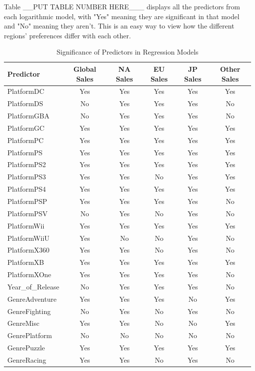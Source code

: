 \documentclass[12pt]{article}
\begin{document}
Table __PUT TABLE NUMBER HERE___ displays all the predictors from each logarithmic model, with "Yes" meaning they are significant in 
that model and "No" meaning they aren't. This is an easy way to view how the different regions' preferences differ with each other. 
\begin{table}[ht]
  \caption{Significance of Predictors in Regression Models}
  \label{tab:significance}
  \centering
  \begin{tabular}{lccccc}
    \hline
    Predictor & Global Sales & NA Sales & EU Sales & JP Sales & Other Sales \\
    \hline
    PlatformDC & Yes & Yes & Yes & Yes & Yes \\
    PlatformDS & No & Yes & Yes & Yes & No \\
    PlatformGBA & No & Yes & Yes & Yes & No \\
    PlatformGC & Yes & Yes & Yes & Yes & Yes \\
    PlatformPC & Yes & Yes & Yes & Yes & Yes \\
    PlatformPS & Yes & Yes & Yes & Yes & Yes \\
    PlatformPS2 & Yes & Yes & Yes & Yes & Yes \\
    PlatformPS3 & Yes & Yes & No & Yes & Yes \\
    PlatformPS4 & Yes & Yes & Yes & Yes & Yes \\
    PlatformPSP & Yes & Yes & Yes & Yes & No \\
    PlatformPSV & No & Yes & No & Yes & No \\
    PlatformWii & Yes & Yes & Yes & Yes & Yes \\
    PlatformWiiU & Yes & No & No & Yes & No \\
    PlatformX360 & Yes & Yes & No & Yes & No \\
    PlatformXB & Yes & Yes & Yes & Yes & Yes \\
    PlatformXOne & Yes & Yes & Yes & Yes & No \\
    Year\_of\_Release & No & Yes & Yes & Yes & No \\
    GenreAdventure & Yes & Yes & Yes & No & Yes \\
    GenreFighting & No & Yes & No & Yes & No \\
    GenreMisc & Yes & Yes & No & No & Yes \\
    GenrePlatform & No & No & No & No & No \\
    GenrePuzzle & Yes & Yes & Yes & Yes & Yes \\
    GenreRacing & Yes & Yes & No & Yes & No \\

\end{tabular}
\end{table}
\end{document}
